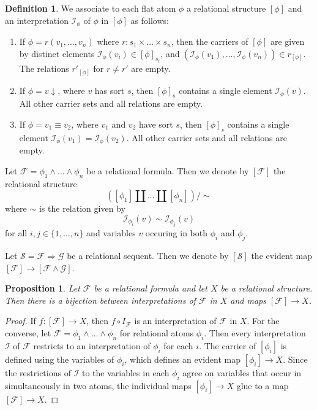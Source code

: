 \documentclass[a4paper]{article}
\newtheorem{proposition}[theorem]{Proposition}
\theoremstyle{remark}
\theoremstyle{definition}
\newtheorem{definition}[theorem]{Definition}
\begin{document}
\begin{definition}
  We associate to each flat atom $\phi$ a relational structure $[\phi]$ and an interpretation $\mathcal{I}_\phi$ of $\phi$ in $[\phi]$ as follows:
  \begin{enumerate}
    \item
      If $\phi = r(v_1, \dots, v_n)$ where $r : s_1 \times \dots \times s_n$, then the carriers of $[\phi]$ are given by distinct elements $\mathcal{I}_\phi(v_i) \in [\phi]_{s_i}$, and $(\mathcal{I}_\phi(v_1), \dots, \mathcal{I}_\phi(v_n)) \in r_{[\phi]}$.
      The relations $r'_{[\phi]}$ for $r \neq r'$ are empty.
    \item
      If $\phi = v \downarrow$, where $v$ has sort $s$, then $[\phi]_s$ contains a single element $\mathcal{I}_\phi(v)$.
      All other carrier sets and all relations are empty.
    \item
      If $\phi = v_1 \equiv v_2$, where $v_1$ and $v_2$ have sort $s$, then $[\phi]_s$ contains a single element $\mathcal{I}_\phi(v_1) = \mathcal{I}_\phi(v_2)$.
      All other carrier sets and all relations are empty.
  \end{enumerate}

  Let $\mathcal{F} = \phi_1 \land \dots \land \phi_n$ be a relational formula.
  Then we denote by $[\mathcal{F}]$ the relational structure
  \begin{equation}
    ([\phi_1] \amalg \dots \amalg [\phi_n]) / \sim
  \end{equation}
  where $\sim$ is the relation given by
  \begin{equation}
    \mathcal{I}_{\phi_i}(v) \sim \mathcal{I}_{\phi_j}(v)
  \end{equation}
  for all $i, j \in \{1, \dots, n\}$ and variables $v$ occuring in both $\phi_i$ and $\phi_j$.
  
  Let $\mathcal{S} = \mathcal{F} \Rightarrow \mathcal{G}$ be a relational sequent.
  Then we denote by $[\mathcal{S}]$ the evident map $[\mathcal{F}] \rightarrow [\mathcal{F} \land \mathcal{G}]$.
\end{definition}

\begin{proposition}
  \label{prop:relational-formula-structure-universal}
  Let $\mathcal{F}$ be a relational formula and let $X$ be a relational structure.
  Then there is a bijection between interpretations of $\mathcal{F}$ in $X$ and maps $[\mathcal{F}] \rightarrow X$.
\end{proposition}
\begin{proof}
  If $f : [\mathcal{F}] \rightarrow X$, then $f \circ I_\mathcal{F}$ is an interpretation of $\mathcal{F}$ in $X$.
  For the converse, let $\mathcal{F} = \phi_1 \land \dots \land \phi_n$ for relational atoms $\phi_i$.
  Then every interpretation $\mathcal{I}$ of $\mathcal{F}$ restricts to an interpretation of $\phi_i$ for each $i$.
  The carrier of $[\phi_i]$ is defined using the variables of $\phi_i$, which defines an evident map $[\phi_i] \rightarrow X$.
  Since the restrictions of $\mathcal{I}$ to the variables in each $\phi_i$ agree on variables that occur in simultaneously in two atoms, the individual maps $[\phi_i] \rightarrow X$ glue to a map $[\mathcal{F}] \rightarrow X$.
\end{proof}
\end{document}
